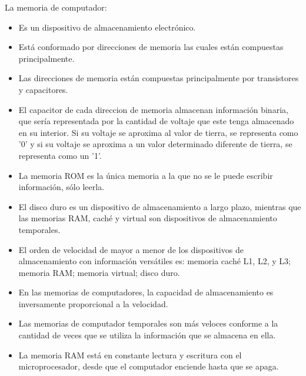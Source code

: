 \documentclass{article}
\begin{document}
La memoria de computador:
    \begin{itemize}
        \item
            Es un dispositivo de almacenamiento electrónico.
        \item 
            Está conformado por direcciones de memoria las cuales están compuestas principalmente.
            
            
            
            
        \item 
            Las direcciones de memoria están compuestas principalmente por transistores y capacitores.
        \item 
             El capacitor de cada direccion de memoria almacenan información binaria, que sería representada por la cantidad de voltaje que este tenga almacenado en su interior. Si su voltaje se aproxima al valor de tierra, se representa como '0' y si su voltaje se aproxima a un valor determinado diferente de tierra, se representa como un '1'.
             
        \item
            La memoria ROM es la única memoria a la que no se le puede escribir información, sólo leerla.
             
            
        \item
            El disco duro es un dispositivo de almacenamiento a largo plazo, mientras que las memorias RAM, caché y virtual son dispositivos de almacenamiento temporales.             
             
             
        \item
            El orden de velocidad de mayor a menor de los dispositivos de almacenamiento con información versátiles es: memoria caché L1, L2, y L3; memoria RAM; memoria virtual; disco duro.
            
            
        \item
            En las memorias de computadores, la capacidad de almacenamiento es inversamente proporcional a la velocidad.
        
        \item
            Las memorias de computador temporales son más veloces conforme a la cantidad de veces que se utiliza la información que se almacena en ella.     
            

        \item
            La memoria RAM está en constante lectura y escritura con el microprocesador, desde que el computador enciende hasta que se apaga.
        

\end{itemize}
\end{document}
